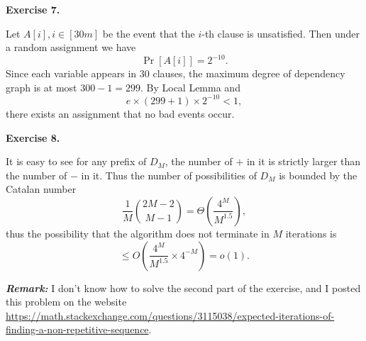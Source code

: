 \documentclass[a4paper]{article}
\newenvironment{exercise}[1]{
	\par
	\noindent\textbf{Exercise #1.}\quad
}{
	\par
	\bigskip
}
\newcommand{\pbra}[1]{\left( #1 \right)}
\newcommand{\sbra}[1]{\left[ #1 \right]}
\begin{document}
\begin{exercise}{7}
    Let $A[i],i\in[30m]$ be the event that the $i$-th clause is unsatisfied. Then under a random assignment we have
    $$
    \Pr\sbra{A[i]}=2^{-10}.
    $$
    Since each variable appears in $30$ clauses, the maximum degree of dependency graph is at most $300-1=299$.
    By Local Lemma and 
    $$
    e\times(299+1)\times2^{-10}<1,
    $$
    there exists an assignment that no bad events occur.
\end{exercise}

\begin{exercise}{8}
    It is easy to see for any prefix of $D_M$, the number of $+$ in it is strictly larger than the number of $-$ in it.
    Thus the number of possibilities of $D_M$ is bounded by the Catalan number
    $$
    \frac1M\binom{2M-2}{M-1}=\Theta\pbra{\frac{4^M}{M^{1.5}}},
    $$
    thus the possibility that the algorithm does not terminate in $M$ iterations is 
    $$
    \leq O\pbra{\frac{4^M}{M^{1.5}}\times4^{-M}}=o(1).
    $$
\end{exercise}
\noindent\textbf{\it Remark:} 
I don't know how to solve the second part of the exercise, and I posted this problem on the website 
\url{https://math.stackexchange.com/questions/3115038/expected-iterations-of-finding-a-non-repetitive-sequence}.
\end{document}
